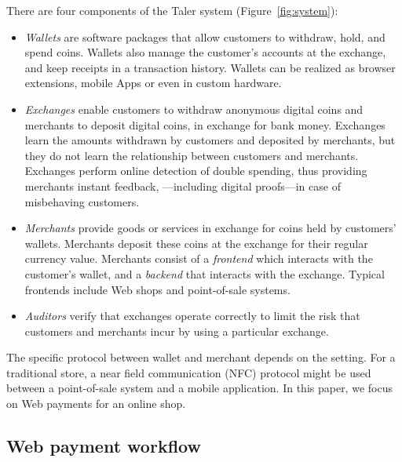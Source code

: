 \documentclass{IEEEtran}
\begin{document}
There are four components of the Taler system (Figure~\ref{fig:system}):

\begin{itemize}
\item
{\em Wallets} are software packages that allow customers to withdraw,
hold, and spend coins.  Wallets also manage the customer's accounts
at the exchange, and keep receipts in a transaction history.  Wallets can be
realized as browser extensions, mobile Apps or even in custom
hardware.

\item
{\em Exchanges} enable customers to withdraw anonymous digital coins
and merchants to deposit digital coins, in exchange for
bank money.  Exchanges learn the amounts withdrawn by customers
and deposited by merchants, but they do not learn the relationship
between customers and merchants.  Exchanges perform online detection
of double spending, thus providing merchants instant feedback,
---including digital proofs---in case of misbehaving customers.

\item
{\em Merchants} provide goods or services in exchange for coins held
by customers' wallets.  Merchants deposit these coins at the
exchange for their regular currency value.  Merchants consist of a
{\em frontend} which interacts with the customer's wallet, and a {\em
backend} that interacts with the exchange.  Typical frontends include
Web shops and point-of-sale systems.

\item
{\em Auditors} verify that exchanges operate correctly to limit the risk
that customers and merchants incur by using a particular exchange.
\end{itemize}

The specific protocol between wallet and merchant depends on the
setting.  For a traditional store, a near field communication (NFC) protocol might be used
between a point-of-sale system and a mobile application.  In this
paper, we focus on Web payments for an online shop.



\subsection{Web payment workflow}
\end{document}
